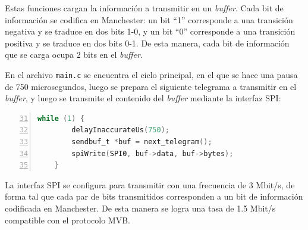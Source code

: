 Estas funciones cargan la información a transmitir en un \textit{buffer}. Cada bit de información se codifica en Manchester: un bit ``1'' corresponde a una transición negativa y se traduce en dos bits 1-0, y un bit ``0'' corresponde a una transición positiva y se traduce en dos bits 0-1. De esta manera, cada bit de información que se carga ocupa 2 bits en el \textit{buffer}.

En el archivo \texttt{main.c} se encuentra el ciclo principal, en el que se hace una pausa de 750 microsegundos, luego se prepara el siguiente telegrama a transmitir en el \textit{buffer}, y luego se transmite el contenido del \textit{buffer} mediante la interfaz SPI:

\begin{lstlisting}[numberstyle=\footnotesize\ttfamily,language=C,breaklines=true,numbers=left,firstnumber=31,backgroundcolor=\color{light-gray},xleftmargin=1cm]
    while (1) {
        delayInaccurateUs(750);
        sendbuf_t *buf = next_telegram();
        spiWrite(SPI0, buf->data, buf->bytes);
    }
\end{lstlisting}

La interfaz SPI se configura para transmitir con una frecuencia de 3 Mbit/s, de forma tal que cada par de bits transmitidos corresponden a un bit de información codificada en Manchester. De esta manera se logra una tasa de 1.5 Mbit/s compatible con el protocolo MVB.
